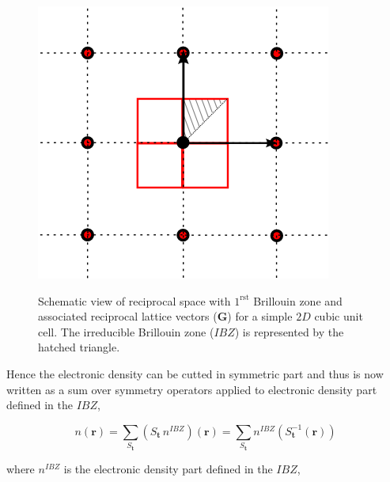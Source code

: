\documentclass[a4paper,12pt]{report}
\begin{document}
\begin{figure}[!t]
\centering
\begin{minipage}[c]{0.45\textwidth}
\includegraphics[width = \textwidth]{IBZ}
\end{minipage}
\vspace{0.1\textwidth}
\begin{minipage}[c]{0.8\textwidth}
\caption{\small Schematic view of reciprocal space with $1^{\text{rst}}$ Brillouin zone and associated reciprocal lattice vectors ($\mathbf{G}$) for a simple $2D$ cubic unit cell. The irreducible Brillouin zone ($IBZ$) is represented by the hatched triangle.}
\vspace*{0.5ex}
\label{fig_IBZ}
\end{minipage}
\end{figure}

Hence the electronic density can be cutted in symmetric part and thus is now written as a sum over symmetry operators applied to electronic density part defined in the $IBZ$,

\begin{equation}
n(\mathbf{r}) = \sum_{S_{\mathbf{t}}} \left( S_{\mathbf{t}}\, n^{IBZ} \right) (\mathbf{r}) = \sum_{S_{\mathbf{t}}} n^{IBZ} \left(S_{\mathbf{t}}^{-1}(\mathbf{r})\right) \label{eqnIBZr}
\end{equation}

where $n^{IBZ}$ is the electronic density part defined in the $IBZ$,
\end{document}
